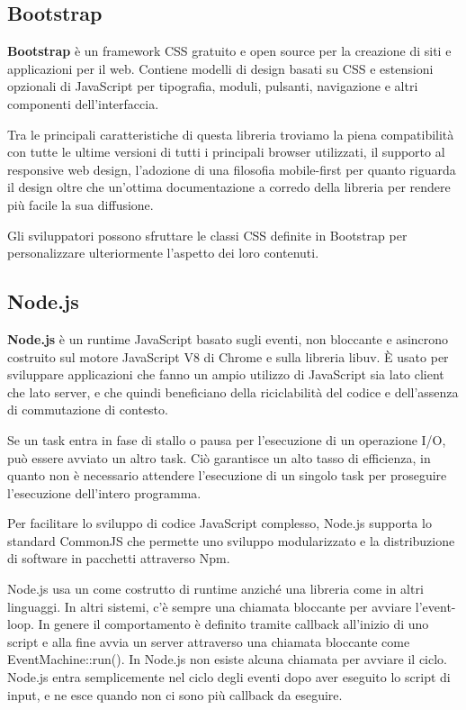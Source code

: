 \subsection{Bootstrap}
\textbf{Bootstrap} è un framework CSS gratuito e open source per la creazione di siti e applicazioni per il web. Contiene modelli di design basati su CSS e estensioni opzionali di JavaScript per tipografia, moduli, pulsanti, navigazione e altri componenti dell'interfaccia.

Tra le principali caratteristiche di questa libreria troviamo la piena compatibilità con tutte le ultime versioni di tutti i principali browser utilizzati, il supporto al responsive web design, l’adozione di una filosofia mobile-first per quanto riguarda il design oltre che un’ottima documentazione a corredo della libreria per rendere più facile la sua diffusione.

Gli sviluppatori possono sfruttare le classi CSS definite in Bootstrap per personalizzare ulteriormente l'aspetto dei loro contenuti.\cite{bootstrap}

\subsection{Node.js}
\textbf{Node.js} è un runtime JavaScript basato sugli eventi, non bloccante e asincrono costruito sul motore JavaScript V8 di Chrome e sulla libreria libuv. È usato per sviluppare applicazioni che fanno un ampio utilizzo di JavaScript sia lato client che lato server, e che quindi beneficiano della riciclabilità del codice e dell'assenza di commutazione di contesto.

Se un task entra in fase di stallo o pausa per l'esecuzione di un operazione I/O, può essere avviato un altro task. Ciò garantisce un alto tasso di efficienza, in quanto non è necessario attendere l'esecuzione di un singolo task per proseguire l'esecuzione dell'intero programma.

Per facilitare lo sviluppo di codice JavaScript complesso, Node.js supporta lo standard CommonJS che permette uno sviluppo modularizzato e la distribuzione di software in pacchetti attraverso Npm.\cite{stackoverflow-node.js}

Node.js usa un  come costrutto di runtime anziché una libreria come in altri linguaggi. In altri sistemi, c'è sempre una chiamata bloccante per avviare l'event-loop. In genere il comportamento è definito tramite callback all'inizio di uno script e alla fine avvia un server attraverso una chiamata bloccante come EventMachine::run(). In Node.js non esiste alcuna chiamata per avviare il ciclo. Node.js entra semplicemente nel ciclo degli eventi dopo aver eseguito lo script di input, e ne esce quando non ci sono più callback da eseguire.\cite{node.js-about}

